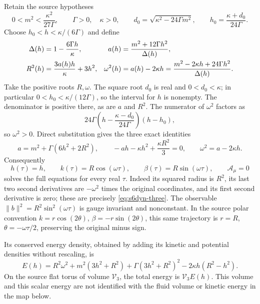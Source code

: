 Retain the source hypotheses
\[
 0<m^2<\frac{\kappa^2}{27\Gamma},\qquad \Gamma>0,\quad\kappa>0,
 \qquad d_0=\sqrt{\kappa^2-24\Gamma m^2},\qquad
 h_0=\frac{\kappa+d_0}{24\Gamma}.
\]
Choose $h_0<h<\kappa/(6\Gamma)$ and define
\begin{align}
 \Delta(h)&=1-\frac{6\Gamma h}{\kappa},&
 a(h)&=\frac{m^2+12\Gamma h^2}{\Delta(h)},\notag\\
 R^2(h)&=\frac{3a(h)h}{\kappa}+3h^2,&
 \omega^2(h)&=a(h)-2\kappa h
   =\frac{m^2-2\kappa h+24\Gamma h^2}{\Delta(h)}.
 \label{eq:s6dyn-parameters}
\end{align}
Take the positive roots $R,\omega$. The square root $d_0$ is real and
$0<d_0<\kappa$; in particular $0<h_0<\kappa/(12\Gamma)$, so the interval
for $h$ is nonempty. The denominator is positive there, as are $a$ and
$R^2$. The numerator of $\omega^2$ factors as
\[
 24\Gamma\left(h-\frac{\kappa-d_0}{24\Gamma}\right)(h-h_0),
\]
so $\omega^2>0$. Direct substitution gives the three exact identities
\begin{equation}\label{eq:s6dyn-three-identities}
 a=m^2+\Gamma(6h^2+2R^2),\qquad
 -ah-\kappa h^2+\frac{\kappa R^2}{3}=0,\qquad
 \omega^2=a-2\kappa h.
\end{equation}
Consequently
\begin{equation}\label{eq:s6dyn-oscillator}
 h(\tau)=h,\qquad k(\tau)=R\cos(\omega\tau),\qquad
 \beta(\tau)=R\sin(\omega\tau),\qquad\mathcal A_\mu=0
\end{equation}
solves the full equations for every real $\tau$. Indeed its squared radius
is $R^2$, its last two second derivatives are $-\omega^2$ times the original
coordinates, and its first second derivative is zero; these are precisely
\eqref{eq:s6dyn-three}. The observable $\|b\|^2=R^2\sin^2(\omega\tau)$
is gauge invariant and nonconstant. In the source polar convention
$k=r\cos(2\theta)$, $\beta=-r\sin(2\theta)$, this same trajectory is
$r=R$, $\theta=-\omega\tau/2$, preserving the original minus sign.

Its conserved energy density, obtained by adding its kinetic and potential
densities without rescaling, is
\begin{equation}\label{eq:s6dyn-source-energy}
 E(h)=R^2\omega^2+m^2(3h^2+R^2)+\Gamma(3h^2+R^2)^2
                 -2\kappa h(R^2-h^2).
\end{equation}
On the source flat torus of volume $\mathcal V_3$, the total energy is
$\mathcal V_3E(h)$. This volume and this scalar energy are not identified
with the fluid volume or kinetic energy in the map below.

